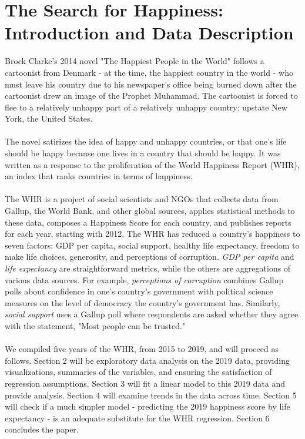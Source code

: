 \documentclass{article}
\begin{document}
\section{The Search for Happiness: Introduction and Data Description}
Brock Clarke's 2014 novel "The Happiest People in the World" follows a cartoonist from Denmark - at the time, the happiest country in the world - who must leave his country due to his newspaper's office being burned down after the cartoonist drew an image of the Prophet Muhammad. The cartoonist is forced to flee to a relatively unhappy part of a relatively unhappy country: upstate New York, the United States.\\\\
The novel satirizes the idea of happy and unhappy countries, or that one's life should be happy because one lives in a country that should be happy. It was written as a response to the proliferation of the World Happiness Report (WHR), an index that ranks countries in terms of happiness.\\\\
The WHR is a project of social scientists and NGOs that collects data from Gallup, the World Bank, and other global sources, applies statistical methods to these data, composes a Happiness Score for each country, and publishes reports for each year, starting with 2012. The WHR has reduced a country's happiness to seven factors: GDP per capita, social support, healthy life expectancy, freedom to make life choices, generosity, and perceptions of corruption. \textit{GDP per capita} and \textit{life expectancy} are straightforward metrics, while the others are aggregations of various data sources. For example, \textit{perceptions of corruption} combines Gallup polls about confidence in one's country's government with political science measures on the level of democracy the country's government has. Similarly, \textit{social support} uses a Gallup poll where respondents are asked whether they agree with the statement, "Most people can be trusted."\\\\
We compiled five years of the WHR, from 2015 to 2019, and will proceed as follows. Section 2 will be exploratory data analysis on the 2019 data, providing visualizations, summaries of the variables, and ensuring the satisfaction of regression assumptions. Section 3 will fit a linear model to this 2019 data and provide analysis. Section 4 will examine trends in the data across time. Section 5 will check if a much simpler model - predicting the 2019 happiness score by life expectancy - is an adequate substitute for the WHR regression. Section 6 concludes the paper.
\newpage
\end{document}

